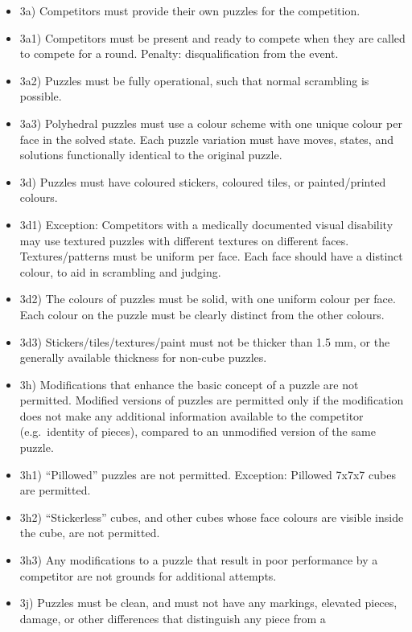 \begin{itemize}
\item
  3a) Competitors must provide their own puzzles for the competition.
\item
  3a1) Competitors must be present and ready to compete when they are
  called to compete for a round. Penalty: disqualification from the
  event.
\item
  3a2) Puzzles must be fully operational, such that normal scrambling is
  possible.
\item
  3a3) Polyhedral puzzles must use a colour scheme with one unique
  colour per face in the solved state. Each puzzle variation must have
  moves, states, and solutions functionally identical to the original
  puzzle.
\item
  3d) Puzzles must have coloured stickers, coloured tiles, or
  painted/printed colours.
\item
  3d1) Exception: Competitors with a medically documented visual
  disability may use textured puzzles with different textures on
  different faces. Textures/patterns must be uniform per face. Each face
  should have a distinct colour, to aid in scrambling and judging.
\item
  3d2) The colours of puzzles must be solid, with one uniform colour per
  face. Each colour on the puzzle must be clearly distinct from the
  other colours.
\item
  3d3) Stickers/tiles/textures/paint must not be thicker than 1.5 mm, or
  the generally available thickness for non-cube puzzles.
\item
  3h) Modifications that enhance the basic concept of a puzzle are not
  permitted. Modified versions of puzzles are permitted only if the
  modification does not make any additional information available to the
  competitor (e.g.~identity of pieces), compared to an unmodified
  version of the same puzzle.
\item
  3h1) ``Pillowed'' puzzles are not permitted. Exception: Pillowed 7x7x7
  cubes are permitted.
\item
  3h2) ``Stickerless'' cubes, and other cubes whose face colours are
  visible inside the cube, are not permitted.
\item
  3h3) Any modifications to a puzzle that result in poor performance by
  a competitor are not grounds for additional attempts.
\item
  3j) Puzzles must be clean, and must not have any markings, elevated
  pieces, damage, or other differences that distinguish any piece from a

\end{itemize}
